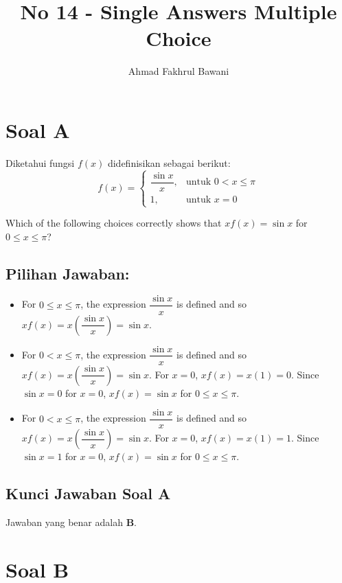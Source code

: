 \documentclass[12pt,a4paper]{article}
\title{No 14 - Single Answers Multiple Choice}
\author{Ahmad Fakhrul Bawani}
\date{}
\begin{document}
\maketitle

\section*{Soal A}

Diketahui fungsi $f(x)$ didefinisikan sebagai berikut:
\begin{equation*}
  f(x) = 
  \begin{cases} 
    \dfrac{\sin x}{x}, & \text{untuk } 0 < x \le \pi \\[1ex]
    1, & \text{untuk } x = 0 
  \end{cases}
\end{equation*}

Which of the following choices correctly shows that $x f(x) = \sin x$ for $0 \le x \le \pi$?

\subsection*{Pilihan Jawaban:}

\begin{itemize}
  \item[\textbf{A.}] For $0 \le x \le \pi$, the expression $\dfrac{\sin x}{x}$ is defined and so $x f(x) = x \left(\dfrac{\sin x}{x}\right) = \sin x$.
  
  \item[\textbf{B.}] For $0 < x \le \pi$, the expression $\dfrac{\sin x}{x}$ is defined and so $x f(x) = x \left(\dfrac{\sin x}{x}\right) = \sin x$. For $x = 0$, $x f(x) = x(1) = 0$. Since $\sin x = 0$ for $x = 0$, $x f(x) = \sin x$ for $0 \le x \le \pi$.
  
  \item[\textbf{C.}] For $0 < x \le \pi$, the expression $\dfrac{\sin x}{x}$ is defined and so $x f(x) = x \left(\dfrac{\sin x}{x}\right) = \sin x$. For $x = 0$, $x f(x) = x(1) = 1$. Since $\sin x = 1$ for $x = 0$, $x f(x) = \sin x$ for $0 \le x \le \pi$.
\end{itemize}

\subsection*{Kunci Jawaban Soal A}
Jawaban yang benar adalah \textbf{B}.

\section*{Soal B}
\end{document}
